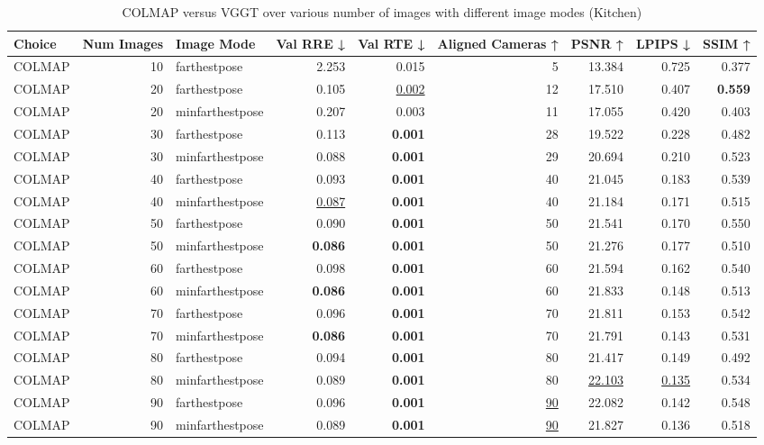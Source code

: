 \begin{table}[H]
\caption{COLMAP versus VGGT over various number of images with different image modes (Kitchen)}
\label{tab:01_num_images_image_mode_kitchen}
\centering
\scriptsize
\begin{tabular}{lrlrrrrrr}
\toprule
Choice & Num Images & Image Mode & Val RRE ↓ & Val RTE ↓ & Aligned Cameras ↑ & PSNR ↑ & LPIPS ↓ & SSIM ↑ \\
\midrule
COLMAP & 10 & farthestpose & 2.253 & 0.015 & 5 & 13.384 & 0.725 & 0.377 \\
COLMAP & 20 & farthestpose & 0.105 & \underline{0.002} & 12 & 17.510 & 0.407 & \textbf{0.559} \\
COLMAP & 20 & minfarthestpose & 0.207 & 0.003 & 11 & 17.055 & 0.420 & 0.403 \\
COLMAP & 30 & farthestpose & 0.113 & \textbf{0.001} & 28 & 19.522 & 0.228 & 0.482 \\
COLMAP & 30 & minfarthestpose & 0.088 & \textbf{0.001} & 29 & 20.694 & 0.210 & 0.523 \\
COLMAP & 40 & farthestpose & 0.093 & \textbf{0.001} & 40 & 21.045 & 0.183 & 0.539 \\
COLMAP & 40 & minfarthestpose & \underline{0.087} & \textbf{0.001} & 40 & 21.184 & 0.171 & 0.515 \\
COLMAP & 50 & farthestpose & 0.090 & \textbf{0.001} & 50 & 21.541 & 0.170 & 0.550 \\
COLMAP & 50 & minfarthestpose & \textbf{0.086} & \textbf{0.001} & 50 & 21.276 & 0.177 & 0.510 \\
COLMAP & 60 & farthestpose & 0.098 & \textbf{0.001} & 60 & 21.594 & 0.162 & 0.540 \\
COLMAP & 60 & minfarthestpose & \textbf{0.086} & \textbf{0.001} & 60 & 21.833 & 0.148 & 0.513 \\
COLMAP & 70 & farthestpose & 0.096 & \textbf{0.001} & 70 & 21.811 & 0.153 & 0.542 \\
COLMAP & 70 & minfarthestpose & \textbf{0.086} & \textbf{0.001} & 70 & 21.791 & 0.143 & 0.531 \\
COLMAP & 80 & farthestpose & 0.094 & \textbf{0.001} & 80 & 21.417 & 0.149 & 0.492 \\
COLMAP & 80 & minfarthestpose & 0.089 & \textbf{0.001} & 80 & \underline{22.103} & \underline{0.135} & 0.534 \\
COLMAP & 90 & farthestpose & 0.096 & \textbf{0.001} & \underline{90} & 22.082 & 0.142 & 0.548 \\
COLMAP & 90 & minfarthestpose & 0.089 & \textbf{0.001} & \underline{90} & 21.827 & 0.136 & 0.518 \\

\end{tabular}
\end{table}
